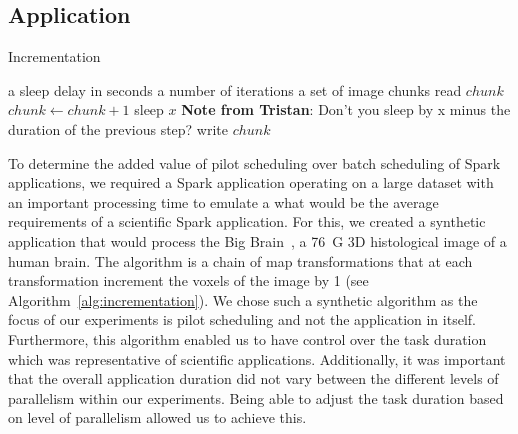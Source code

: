 \documentclass{IEEEtran}
\newcommand{\Desc}[2]{\State \makebox[2em][l]{#1}#2}
\newcommand{\tristan}[1]{\color{red}\textbf{Note from Tristan}:
      #1 \color{black}}
\newcommand{\TG}[1]{\tristan{#1}}
\begin{document}
    \subsection{Application}
        \begin{algorithm}\caption{Incrementation}\label{alg:incrementation}              
            \begin{algorithmic}[1]                                                       
                \Input                                                                       
                    \Desc{$x$}{a sleep delay in seconds}                                         
                    \Desc{$n$}{a number of iterations}                                           
                    \Desc{$C$}{a set of image chunks}                                            
                \EndInput                                                                    
                    \State read $chunk$                                        
                        \State $chunk\gets chunk+1$                                              
                        \State sleep $x$ \TG{Don't you sleep by x minus the duration of the previous step?}                                                        
                    \EndFor                                                                      
                    \State write $chunk$                                            
                \EndFor                                                                      
            \end{algorithmic}                                                                
        \end{algorithm}
    To determine the added value of pilot scheduling over batch scheduling of Spark
    applications, we required a Spark application operating on a large dataset with
    an important processing time to emulate a what would be the average requirements
    of a scientific Spark application. For this, we created a synthetic application 
    that would process the Big Brain~\cite{bigBrain}, a 76~G 3D histological
    image of a human brain. The algorithm is a chain of map transformations that
    at each transformation increment the voxels of the image by 1 (see Algorithm~\ref{alg:incrementation}).
    We chose such a synthetic algorithm
    as the focus of our experiments is pilot scheduling and not the application in
    itself. Furthermore, this algorithm enabled us to have control over the task duration
    which was representative of scientific applications. Additionally, it was important
    that the overall application duration did not vary between the different levels of
    parallelism within our experiments. Being able to adjust the task duration based on
    level of parallelism allowed us to achieve this.
\end{document}
